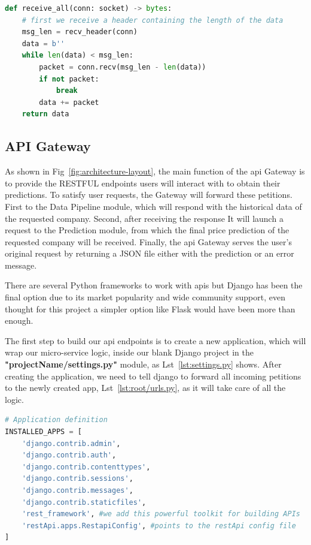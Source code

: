 \begin{lstlisting}[language=python,caption=Custom Implementation receiveall(),label={lst:receive-all}]
def receive_all(conn: socket) -> bytes:
    # first we receive a header containing the length of the data
    msg_len = recv_header(conn)
    data = b''
    while len(data) < msg_len:
        packet = conn.recv(msg_len - len(data))
        if not packet:
            break
        data += packet
    return data
\end{lstlisting}

\subsection{API Gateway}

As shown in Fig~\ref{fig:architecture-layout}, the main function of the \gls{api} Gateway is to provide the RESTFUL endpoints users will interact with to obtain their predictions. To satisfy user requests, the Gateway will forward these petitions. First to the Data Pipeline module, which will respond with the historical data of the requested company. Second, after receiving the response It will launch a request to the Prediction module, from which the final price prediction of the requested company will be received. Finally, the \gls{api} Gateway serves the user's original request by returning a JSON file either with the prediction or an error message.

There are several Python frameworks to work with \glspl{api} but Django has been the final option due to its market popularity and wide community support, even thought for this project a simpler option like Flask would have been more than enough.

The first step to build our \gls{api} endpoints is to create a new application, which will wrap our micro-service logic, inside our blank Django project in the \textbf{"projectName/settings.py"} module, as Lst~\ref{lst:settings.py} shows. After creating the application, we need to tell django to forward all incoming petitions to the newly created app, Lst~\ref{lst:root/urls.py}, as it will take care of all the logic.\newpage

\begin{lstlisting}[language=python,caption=apiGateway/settings.py,label={lst:settings.py}]
# Application definition
INSTALLED_APPS = [
    'django.contrib.admin',
    'django.contrib.auth',
    'django.contrib.contenttypes',
    'django.contrib.sessions',
    'django.contrib.messages',
    'django.contrib.staticfiles',
    'rest_framework', #we add this powerful toolkit for building APIs
    'restApi.apps.RestapiConfig', #points to the restApi config file
]
\end{lstlisting}

